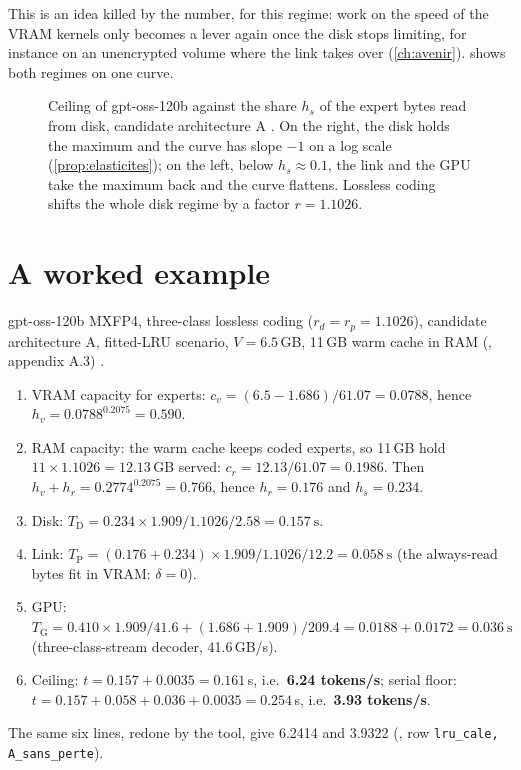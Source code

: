 This is an idea killed by the number, for this regime: work on the speed of the VRAM kernels only becomes a lever again once the disk stops limiting, for instance on an unencrypted volume where the link takes over (\cref{ch:avenir}).  shows both regimes on one curve.

\begin{figure}[ht]
\centering
\GraphePlafondHs
\caption[The ceiling against the share read from disk]{Ceiling of gpt-oss-120b against the share $h_s$ of the expert bytes read from disk, candidate architecture A \calc. On the right, the disk holds the maximum and the curve has slope $-1$ on a log scale (\cref{prop:elasticites}); on the left, below $h_s \approx 0.1$, the link and the GPU take the maximum back and the curve flattens. Lossless coding shifts the whole disk regime by a factor $r = 1.1026$.}
\label{fig:plafond-hs}
\end{figure}

\section{A worked example}\label{sec:exemple-pose}

gpt-oss-120b MXFP4, three-class lossless coding ($r_d = r_p = 1.1026$), candidate architecture A, fitted-LRU scenario, $V = 6.5$\,GB, 11\,GB warm cache in RAM (, appendix A.3) \calc.
\begin{enumerate}
\item VRAM capacity for experts: $c_v = (6.5 - 1.686)/61.07 = 0.0788$, hence $h_v = 0.0788^{0.2075} = 0.590$.
\item RAM capacity: the warm cache keeps coded experts, so 11\,GB hold $11 \times 1.1026 = 12.13$\,GB served: $c_r = 12.13/61.07 = 0.1986$. Then $h_v + h_r = 0.2774^{0.2075} = 0.766$, hence $h_r = 0.176$ and $h_s = 0.234$.
\item Disk: $T_{\mathrm{D}} = 0.234 \times 1.909 / 1.1026 / 2.58 = \SI{0.157}{\second}$.
\item Link: $T_{\mathrm{P}} = (0.176 + 0.234) \times 1.909 / 1.1026 / 12.2 = \SI{0.058}{\second}$ (the always-read bytes fit in VRAM: $\delta = 0$).
\item GPU: $T_{\mathrm{G}} = 0.410 \times 1.909 / 41.6 + (1.686 + 1.909)/209.4 = 0.0188 + 0.0172 = \SI{0.036}{\second}$ (three-class-stream decoder, 41.6\,GB/s).
\item Ceiling: $t = 0.157 + 0.0035 = 0.161$\,s, i.e.\ \textbf{6.24 tokens/s}; serial floor: $t = 0.157 + 0.058 + 0.036 + 0.0035 = 0.254$\,s, i.e.\ \textbf{3.93 tokens/s}.
\end{enumerate}
The same six lines, redone by the tool, give 6.2414 and 3.9322 (, row \texttt{lru\_cale, A\_sans\_perte}).

